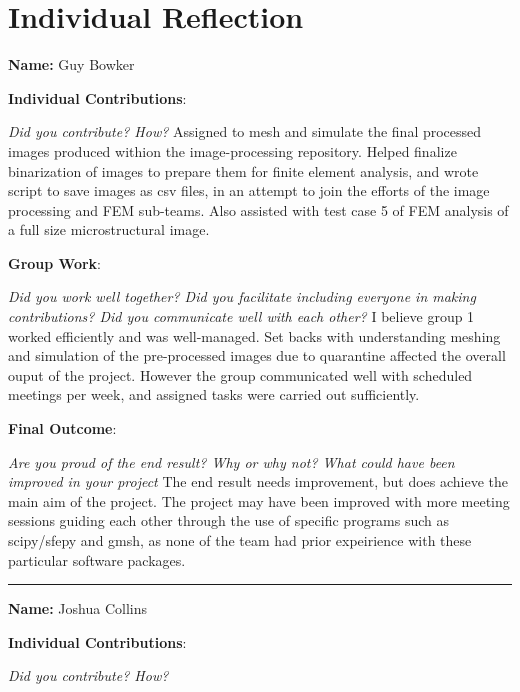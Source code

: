 \documentclass[report.tex]{subfiles}
\begin{document}
\section{Individual Reflection}

\noindent \textbf{Name:} Guy Bowker \newline

\noindent \textbf{Individual Contributions}:

\noindent \emph{Did you contribute? How?} \newline
Assigned to mesh and simulate the final processed images produced withion the image-processing repository. Helped finalize binarization of images to prepare them for finite element analysis, and wrote script to save images as csv files, in an attempt to join the efforts of the image processing and FEM sub-teams. Also assisted with test case 5 of FEM analysis of a full size microstructural image.

\noindent \textbf{Group Work}:

\noindent \emph{Did you work well together? Did you facilitate including everyone in making contributions? Did you communicate well with each other?} \newline
I believe group 1 worked efficiently and was well-managed. Set backs with understanding meshing and simulation of the pre-processed images due to quarantine affected the overall ouput of the project. However the group communicated well with scheduled meetings per week, and assigned tasks were carried out sufficiently.

\noindent \textbf{Final Outcome}:

\noindent \emph{Are you proud of the end result? Why or why not? What could have been improved in your project} \newline
The end result needs improvement, but does achieve the main aim of the project. The project may have been improved with more meeting sessions guiding each other through the use of specific programs such as scipy/sfepy and gmsh, as none of the team had prior expeirience with these particular software packages.

\noindent\rule{17cm}{0.4pt}

\noindent \textbf{Name:} Joshua Collins \newline

\noindent \textbf{Individual Contributions}:

\noindent \emph{Did you contribute? How?} \newline
\end{document}
